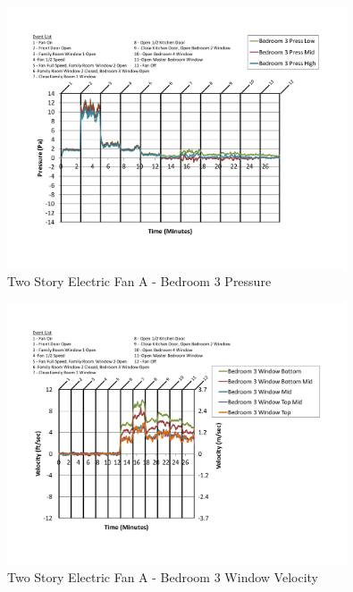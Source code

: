 \documentclass{article}
\begin{document}
\begin{appendices}
	\begin{figure}[H]
		\centering
		\includegraphics[height=3.05in,trim=0.67in 1.1in 0.67in 0.8in,clip=true]{0_Images/Results_Charts/ColdFlow/Two_Story/Electric/A/Bedroom_3_Pressure.pdf}
		\caption{Two Story Electric Fan A - Bedroom 3 Pressure}
	\end{figure}
 

	\begin{figure}[H]
		\centering
		\includegraphics[height=3.05in,trim=0.67in 1.1in 0.67in 0.8in,clip=true]{0_Images/Results_Charts/ColdFlow/Two_Story/Electric/A/Bedroom_3_Window_Velocity.pdf}
		\caption{Two Story Electric Fan A - Bedroom 3 Window Velocity}
	\end{figure}
 
	\clearpage


\end{appendices}
\end{document}
